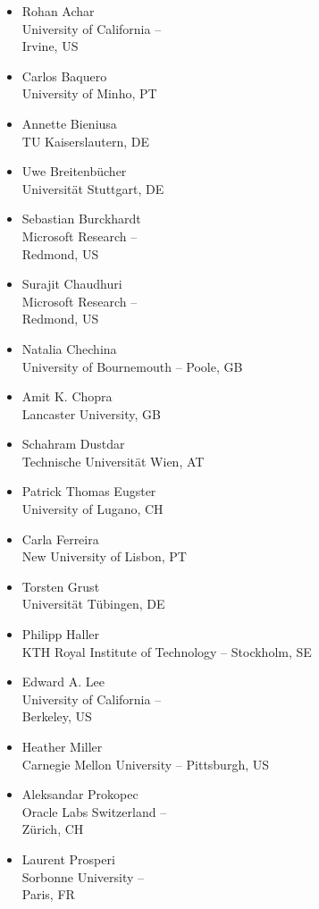 \documentclass[a4paper,UKenglish]{dagrep-v2018}
\begin{document}
\begin{multicols}{3}
  \begin{itemize}
  \item Rohan Achar\\University of California -- \\Irvine, US
  \item Carlos Baquero\\University of Minho, PT
  \item Annette Bieniusa\\TU Kaiserslautern, DE
  \item Uwe Breitenb{\"u}cher\\Universit{\"a}t Stuttgart, DE
  \item Sebastian Burckhardt\\Microsoft Research -- \\Redmond, US
  \item Surajit Chaudhuri\\Microsoft Research -- \\Redmond, US
  \item Natalia Chechina\\University of Bournemouth -- Poole, GB
  \item Amit K. Chopra\\Lancaster University, GB
  \item Schahram Dustdar\\Technische Universit{\"a}t Wien, AT
  \item Patrick Thomas Eugster\\University of Lugano, CH
  \item Carla Ferreira\\New University of Lisbon, PT
  \item Torsten Grust\\Universit{\"a}t T{\"u}bingen, DE
  \item Philipp Haller\\KTH Royal Institute of Technology -- Stockholm, SE
  \item Edward A. Lee\\University of California -- \\Berkeley, US
  \item Heather Miller\\Carnegie Mellon University -- Pittsburgh, US
  \item Aleksandar Prokopec\\Oracle Labs Switzerland -- \\Z{\"u}rich, CH
  \item Laurent Prosperi\\Sorbonne University -- \\Paris, FR

\end{itemize}
\end{multicols}
\end{document}
